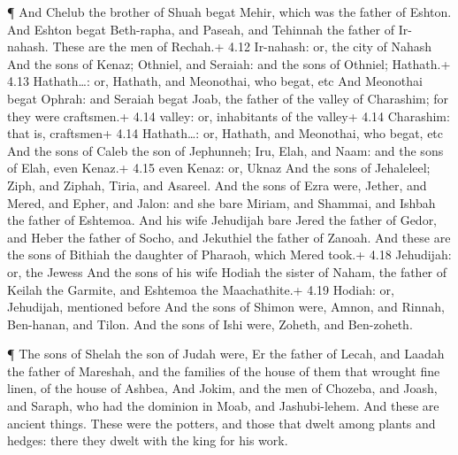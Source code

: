  ¶ And Chelub the brother of Shuah begat Mehir, which was
the father of Eshton.  And Eshton begat Beth-rapha, and
Paseah, and Tehinnah the father of Ir-nahash. These are the men of
Rechah.+ 4.12 Ir-nahash: or, the city of Nahash  And the
sons of Kenaz; Othniel, and Seraiah: and the sons of Othniel; Hathath.+
4.13 Hathath\ldots: or, Hathath, and Meonothai, who begat, etc
 And Meonothai begat Ophrah: and Seraiah begat Joab, the
father of the valley of Charashim; for they were craftsmen.+ 4.14
valley: or, inhabitants of the valley+ 4.14 Charashim: that is,
craftsmen+ 4.14 Hathath\ldots: or, Hathath, and Meonothai, who begat,
etc  And the sons of Caleb the son of Jephunneh; Iru, Elah,
and Naam: and the sons of Elah, even Kenaz.+ 4.15 even Kenaz: or, Uknaz
 And the sons of Jehaleleel; Ziph, and Ziphah, Tiria, and
Asareel.  And the sons of Ezra were, Jether, and Mered, and
Epher, and Jalon: and she bare Miriam, and Shammai, and Ishbah the
father of Eshtemoa.  And his wife Jehudijah bare Jered the
father of Gedor, and Heber the father of Socho, and Jekuthiel the father
of Zanoah. And these are the sons of Bithiah the daughter of Pharaoh,
which Mered took.+ 4.18 Jehudijah: or, the Jewess  And the
sons of his wife Hodiah the sister of Naham, the father of Keilah the
Garmite, and Eshtemoa the Maachathite.+ 4.19 Hodiah: or, Jehudijah,
mentioned before  And the sons of Shimon were, Amnon, and
Rinnah, Ben-hanan, and Tilon. And the sons of Ishi were, Zoheth, and
Ben-zoheth.

 ¶ The sons of Shelah the son of Judah were, Er the father
of Lecah, and Laadah the father of Mareshah, and the families of the
house of them that wrought fine linen, of the house of Ashbea,
 And Jokim, and the men of Chozeba, and Joash, and Saraph,
who had the dominion in Moab, and Jashubi-lehem. And these are ancient
things.  These were the potters, and those that dwelt among
plants and hedges: there they dwelt with the king for his work.

